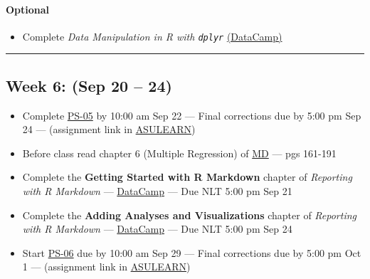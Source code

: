 \documentclass[
]{article}
\providecommand{\tightlist}{%
  \setlength{\itemsep}{0pt}\setlength{\parskip}{0pt}}
\begin{document}
\begin{rmdoptional}
\hypertarget{optional}{%
\paragraph*{Optional}\label{optional}}

\begin{itemize}
\tightlist
\item
  Complete \emph{Data Manipulation in R with \texttt{dplyr}}
  \href{https://www.datacamp.com/}{(DataCamp)}
\end{itemize}
\end{rmdoptional}

\begin{center}\rule{0.5\linewidth}{0.5pt}\end{center}

\hypertarget{week-6-sep-20-24}{%
\subsection*{Week 6: (Sep 20 -- 24)}\label{week-6-sep-20-24}}

\begin{itemize}
\item
  Complete
  \href{https://classroom.github.com/classrooms/87543903-stt3850-fall2021}{PS-05}
  by 10:00 am Sep 22 --- Final corrections due by 5:00 pm Sep 24 ---
  (assignment link in
  \href{https://asulearn.appstate.edu/course/view.php?id=131169}{ASULEARN})
\item
  Before class read chapter 6 (Multiple Regression) of
  \href{https://moderndive.com}{MD} --- pgs 161-191
\item
  Complete the \textbf{Getting Started with R Markdown} chapter of
  \emph{Reporting with R Markdown} ---
  \href{https://app.datacamp.com/groups/stt3850-fall2021/assignments}{DataCamp}
  --- Due NLT 5:00 pm Sep 21
\item
  Complete the \textbf{Adding Analyses and Visualizations} chapter of
  \emph{Reporting with R Markdown} ---
  \href{https://app.datacamp.com/groups/stt3850-fall2021/assignments}{DataCamp}
  --- Due NLT 5:00 pm Sep 24
\item
  Start
  \href{https://classroom.github.com/classrooms/87543903-stt3850-fall2021}{PS-06}
  due by 10:00 am Sep 29 --- Final corrections due by 5:00 pm Oct 1 ---
  (assignment link in
  \href{https://asulearn.appstate.edu/course/view.php?id=131169}{ASULEARN})
\end{itemize}
\end{document}
